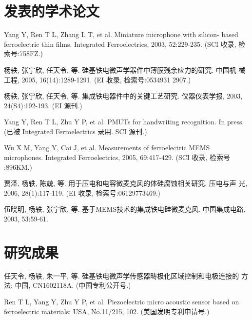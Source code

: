 \begin{resume}
  \section*{发表的学术论文} %

  \begin{enumerate}[label={[\arabic*]},itemsep=0pt,parsep=0pt,labelindent=26pt,labelwidth=*,leftmargin=0pt,itemindent=*,align=left]
   
  \item Yang Y, Ren T L, Zhang L T, et al. Miniature microphone with silicon-
    based ferroelectric thin films. Integrated Ferroelectrics, 2003,
    52:229-235. (SCI 收录, 检索号:758FZ.)
  \item 杨轶, 张宁欣, 任天令, 等. 硅基铁电微声学器件中薄膜残余应力的研究. 中国机
    械工程, 2005, 16(14):1289-1291. (EI 收录, 检索号:0534931 2907.)
  \item 杨轶, 张宁欣, 任天令, 等. 集成铁电器件中的关键工艺研究. 仪器仪表学报,
    2003, 24(S4):192-193. (EI 源刊.)
  \item Yang Y, Ren T L, Zhu Y P, et al. PMUTs for handwriting recognition. In
    press. (已被 Integrated Ferroelectrics 录用. SCI 源刊.)
  \item Wu X M, Yang Y, Cai J, et al. Measurements of ferroelectric MEMS
    microphones. Integrated Ferroelectrics, 2005, 69:417-429. (SCI 收录, 检索号
    :896KM.)
  \item 贾泽, 杨轶, 陈兢, 等. 用于压电和电容微麦克风的体硅腐蚀相关研究. 压电与声
    光, 2006, 28(1):117-119. (EI 收录, 检索号:06129773469.)
  \item 伍晓明, 杨轶, 张宁欣, 等. 基于MEMS技术的集成铁电硅微麦克风. 中国集成电路, 
    2003, 53:59-61.
  \end{enumerate}

  \section*{研究成果} %
  \begin{enumerate}[label={[\arabic*]},itemsep=0pt,parsep=0pt,labelindent=26pt,labelwidth=*,leftmargin=0pt,itemindent=*,align=left]
  \item 任天令, 杨轶, 朱一平, 等. 硅基铁电微声学传感器畴极化区域控制和电极连接的
    方法: 中国, CN1602118A. (中国专利公开号.)
  \item Ren T L, Yang Y, Zhu Y P, et al. Piezoelectric micro acoustic sensor
    based on ferroelectric materials: USA, No.11/215, 102. (美国发明专利申请号.)
  \end{enumerate}
\end{resume}
